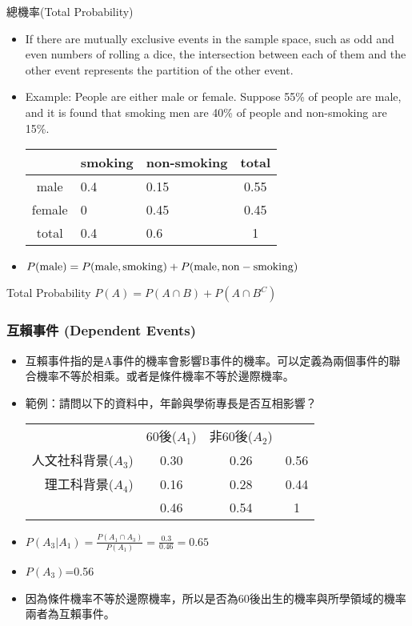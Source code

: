 \documentclass{beamer}
\begin{document}
\begin{frame}{總機率(Total Probability)}
\begin{itemize}
\item If there are mutually exclusive events in the sample space, such as odd and even numbers of rolling a dice, the intersection between each of them and the other event represents the partition of the other event.
\item Example: People are either male or female. Suppose 55\% of people are male, and it is found that smoking men are 40\% of people and non-smoking are 15\%. 
\begin{table}[h]
\begin{tabular}{c|l|l|c}
&smoking&non-smoking& total\\
\hline
male&0.4&0.15&0.55\\
\hline
female&0&0.45&0.45\\
\hline
total&0.4&0.6&1\\
\end{tabular}
\end{table}
\item $P({\rm male})=P({\rm male, smoking})+P({\rm male, non-smoking})$
\end{itemize}
  \begin{alertblock}{Total Probability}
  $P(A)=P(A\cap B)+P(A\cap B^C)$
  \end{alertblock}
\end{frame}
\begin{frame}\frametitle{互賴事件 (Dependent Events)}
\begin{itemize} 
\item 互賴事件指的是A事件的機率會影響B事件的機率。可以定義為兩個事件的聯合機率不等於相乘。或者是條件機率不等於邊際機率。
\item 範例：請問以下的資料中，年齡與學術專長是否互相影響？
\vspace{.5cm}
\begin{table}[ht]
\begin{tabular}{ r | c | c |  c}
\multicolumn{1}{r}{}
 &  \multicolumn{1}{c}{60後($A_{1}$)}
 & \multicolumn{1}{c}{非60後($A_{2}$)} & \\
\cline{2-3}
 人文社科背景($A_{3}$) & 0.30 & 0.26 & 0.56\\
\cline{2-3}
 理工科背景($A_{4}$) & 0.16 & 0.28  & 0.44\\
\cline{2-3}
\multicolumn{1}{r}{}
 &  \multicolumn{1}{c}{0.46} & \multicolumn{1}{c}{0.54} & 1 \\
\end{tabular}
\end{table}

\item $P(A_{3}|A_{1})=\frac{P(A_{1}\cap A_{3})}{P(A_{1})}=\frac{0.3}{0.46}=0.65$
\item $P(A_{3})$=0.56
\item 因為條件機率不等於邊際機率，所以是否為60後出生的機率與所學領域的機率兩者為互賴事件。
\end{itemize}
\end{frame}
\end{document}
